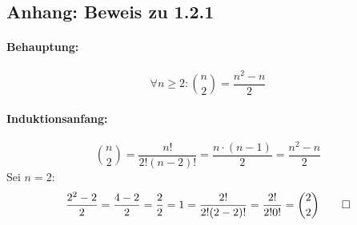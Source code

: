 \documentclass{article}
\begin{document}
\subsection*{Anhang: Beweis zu 1.2.1}
\paragraph{Behauptung:}
	\[
		\forall n \geq 2: \binom{n}{2} = \frac{n^2-n}{2}
	\]
\paragraph{Induktionsanfang:}
	\[
		\binom{n}{2}=\frac{n!}{2!(n-2)!}=\frac{n\cdot(n-1)}{2}=\frac{n^2-n}{2}
	\]
Sei $n=2$:
	\[
		\frac{2^2-2}{2}=\frac{4-2}{2}=\frac{2}{2}=1=\frac{2!}{2!(2-2)!}=\frac{2!}{2!0!}=\binom{2}{2} \qed
	\]
\end{document}

